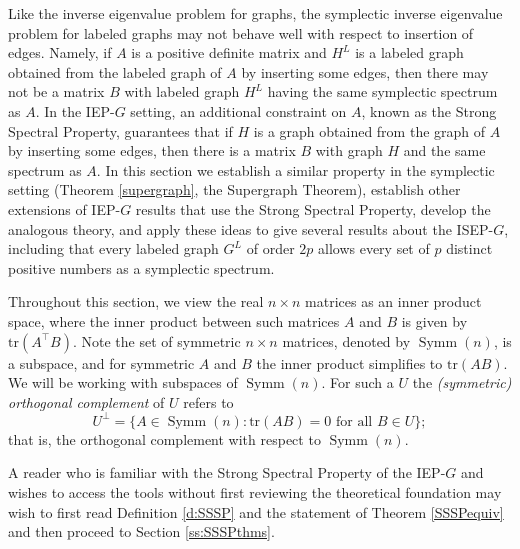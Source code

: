 \documentclass[12pt]{article}
\theoremstyle{definition}
\theoremstyle{definition}
\theoremstyle{definition}
\numberwithin{figure}{section}
\numberwithin{equation}{section}
\newcommand{\symm}{\operatorname{Symm}}
\newcommand{\x}{\times}
\begin{document}
Like the inverse eigenvalue problem for graphs, the {symplectic inverse}  eigenvalue problem for labeled graphs may not behave well with respect to insertion of edges.  Namely,
 if  $A$ 
is a positive definite matrix and $H^L$ is a labeled graph obtained from the labeled graph  of $A$ by inserting some edges, then there may 
not be a matrix $B$ with labeled graph $H^L$ having the same 
symplectic spectrum as $A$.   In the IEP-$G$ setting, an additional constraint on $A$, known as the Strong Spectral Property, guarantees that if $H$ is a graph obtained from the graph of $A$ by inserting some edges,
then there is a matrix $B$ with graph $H$  
and the same spectrum as $A$.  In this section we establish a similar property in the symplectic setting  (Theorem \ref{supergraph}, the Supergraph Theorem), establish other extensions of IEP-$G$ results that use the Strong Spectral Property, develop the analogous theory, {and apply these ideas} to give several results about the  ISEP-$G$, including that every labeled graph $G^L$ of order $2p$ allows every set of $p$ distinct positive numbers as a symplectic spectrum. 
 

Throughout this section, we view the real $n\times n$ matrices as an inner product space, where the 
inner product between such matrices $A$ and $B$ is given by $\mbox{tr}(A^\top B)$. Note the set of symmetric $n\x n$ matrices, denoted by $\symm(n)$,
is a subspace, and for symmetric $A$ and $B$ the inner product simplifies to $\mbox{tr}(AB)$. 
 We will be working with subspaces of $\symm(n)$. For such a $U$ the {\it (symmetric) orthogonal complement}
of $U$ refers to 
\[ U^{\perp}=\{ A\in \symm(n)\colon\mbox{tr}(AB)= 0 
\mbox{ for all $B \in U$} \}; \]   
that is, the orthogonal complement with respect to $\symm(n)$. 


A reader who is familiar with the Strong Spectral Property of the IEP-$G$ and wishes to access the tools without first reviewing the theoretical foundation may wish to first read Definition \ref{d:SSSP} and the statement of Theorem \ref{SSSPequiv} and then proceed to Section \ref{ss:SSSPthms}.
\end{document}
